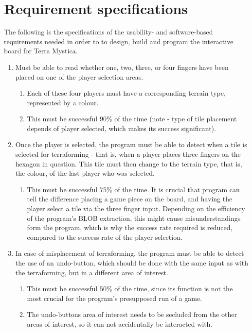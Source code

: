 \section{Requirement specifications}
The following is the specifications of the usability- and software-based requirements needed in order to to design, build and program the interactive board for Terra Mystica.

\begin{enumerate}
\item Must be able to read whether one, two, three, or four fingers have been placed on one of the player selection areas.
	\begin{enumerate}
	\item Each of these four players must have a corresponding terrain type, represented by a colour.
	\item This must be successful 90\% of the time (note - type of tile placement depends of player selected, which makes its success significant).
	\end{enumerate}
\item Once the player is selected, the program must be able to detect when a tile is selected for terraforming - that is, when a player places three fingers on the hexagon in question. This tile must then change to the terrain type, that is, the colour, of the last player who was selected.
	\begin{enumerate}
	\item This must be successful 75\% of the time. It is crucial that program can tell the difference placing a game piece on the board, and having the player select a tile via the three finger input. Depending on the efficiency of the program’s BLOB extraction, this might cause misunderstandings form the program, which is why the success rate required is reduced, compared to the success rate of the player selection.
	\end{enumerate}
\item In case of misplacement of terraforming, the program must be able to detect the use of an undo-button, which should be done with the same input as with the terraforming, but in a different area of interest.
	\begin{enumerate}
	\item This must be successful 50\% of the time, since its function is not the most crucial for the program’s presupposed run of a game.
	\item The undo-buttons area of interest needs to be secluded from the other areas of interest, so it can not accidentally be interacted with. 

\end{enumerate}
\end{enumerate}
